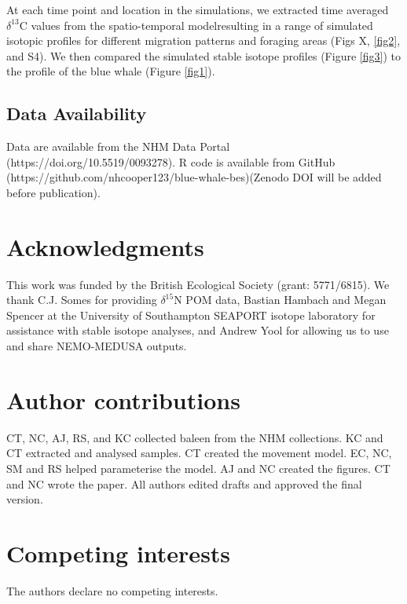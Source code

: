 \documentclass[a4paper,12pt]{article}
\begin{document}
At each time point and location in the simulations, we extracted time averaged \(\delta^{13}\)C values from the spatio-temporal model\cite{magozzi2017using}resulting in a range of simulated isotopic profiles for different migration patterns and foraging areas (Figs X, \ref{fig2}, and S4). %
We then compared the simulated stable isotope profiles (Figure \ref{fig3}) to the profile of the blue whale (Figure \ref{fig1}).

\subsection{Data Availability}
Data are available from the NHM Data Portal (https://doi.org/10.5519/0093278). 
R code is available from GitHub (https://github.com/nhcooper123/blue-whale-bes)(Zenodo DOI will be added before publication).



%


\section{Acknowledgments}\label{acknowledgments}
This work was funded by the British Ecological Society (grant: 5771/6815). 
We thank C.J. Somes for providing  $\delta^{15}$N POM data, Bastian Hambach and Megan Spencer at the University of Southampton SEAPORT isotope laboratory for assistance with stable isotope analyses, and Andrew Yool for allowing us to use and share NEMO-MEDUSA outputs.

\section{Author contributions}\label{author-contributions}
CT, NC, AJ, RS, and KC collected baleen from the NHM collections. 
KC and CT extracted and analysed samples.
CT created the movement model.
EC, NC, SM and RS helped parameterise the model.
AJ and NC created the figures. 
CT and NC wrote the paper.
All authors edited drafts and approved the final version.

\section{Competing interests}
The authors declare no competing interests.
\end{document}
